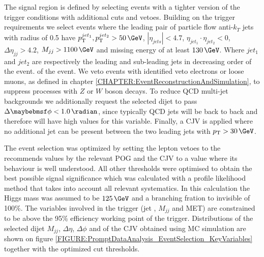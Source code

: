 The signal region is defined by selecting events with a tighter version of the trigger conditions with additional cuts and vetoes. Building on the trigger requirements we select events where the leading pair of particle flow anti-$k_T$ jets with radius of 0.5 have $\pt^{jet_1},\pt^{jet_2} > 50\,\GeV$, $|\eta_{jets}| < 4.7$, $\eta_{jet_1} \cdot \eta_{jet_2} < 0$, $\Delta\eta_{jj}>4.2$, $M_{jj}>1100\,\GeV$ and missing energy of at least $130\,\GeV$. Where $jet_1$ and $jet_2$ are respectively the leading and sub-leading jets in decreasing \pt order of the event. of the event. We veto events with identified veto electrons or loose muons, as defined in chapter \ref{CHAPTER:EventReconstructionAndSimulation}, to suppress processes with $Z$ or $W$ boson decays. To reduce \gls{QCD} multi-jet backgrounds we additionally request the selected dijet to pass $\Delta\phi < 1.0\,\radian$, since typically \gls{QCD} jets will be back to back and therefore will have high values for this variable. Finally, a \acrfull{CJV} is applied where no additional jet can be present between the two leading jets with $\pt > 30\,\GeV$.

The event selection was optimized by setting the lepton vetoes to the recommends values by the relevant \gls{POG} and the \gls{CJV} to a value where its behaviour is well understood. All other thresholds were optimised to obtain the best possible signal significance which was calculated with a profile likelihood method that takes into account all relevant systematics. In this calculation the Higgs mass was assumed to be $125\,\GeV$ and a branching fration to invisible of 100\%. The variables involved in the trigger (jet \pt, $M_{jj}$ and \gls{MET}) are constrained to be above the 95\% efficiency working point of the trigger. Distributions of the selected dijet $M_{jj}$, $\Delta\eta$, $\Delta\phi$ and of the \gls{CJV} obtained using \gls{MC} simulation are shown on figure \ref{FIGURE:PromptDataAnalysis_EventSelection_KeyVariables} together with the optimized cut thresholds.

